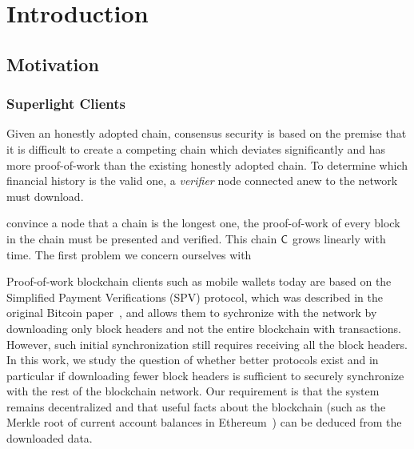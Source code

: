 \chapter{Introduction}\label{chapter:introduction}



\section{Motivation}
\subsection{Superlight Clients}


Given an honestly adopted chain, consensus security is based on the premise that
it is difficult to create a competing chain which deviates significantly and has
more proof-of-work than the existing honestly adopted chain. To determine which
financial history is the valid one, a \emph{verifier} node connected anew to the
network must download.

 convince a node
that a chain is the longest one, the proof-of-work of every block in the chain
must be presented and verified. This chain $\mathsf{C}$ grows linearly with time.
The first problem we concern ourselves with


Proof-of-work blockchain clients such as mobile wallets today are based on the
Simplified Payment Verifications (SPV) protocol, which was described in the
original Bitcoin paper~\cite{bitcoin}, and allows them to sychronize with the
network by downloading only block headers and not the entire blockchain with
transactions. However, such initial synchronization still requires receiving all
the block headers. In this work, we study the question of whether better
protocols exist and in particular if downloading fewer block headers is
sufficient to securely synchronize with the rest of the blockchain network. Our
requirement is that the system remains decentralized and that useful facts about
the blockchain (such as the Merkle root of current account balances in
Ethereum~\cite{wood,buterin}) can be deduced from the downloaded data.


